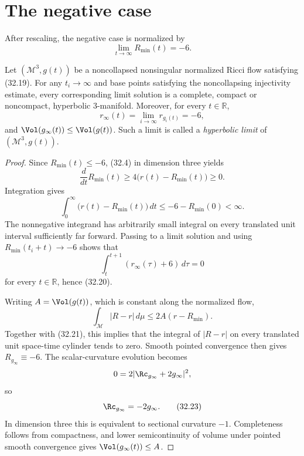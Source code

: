 \section{The negative case}

After rescaling, the negative case is normalized by
\begin{equation*}
 \lim_{t\to\infty}R_{\min}(t)=-6.
 \tag{32.19}
\end{equation*}

\begin{proposition}
\label{prop:chow-iv-negative-case-hyperbolic-limit}
Let $(\mathcal M^3,g(t))$ be a noncollapsed nonsingular normalized Ricci
flow satisfying (32.19).  For any $t_i\to\infty$ and base points satisfying
the noncollapsing injectivity estimate, every corresponding limit solution
is a complete, compact or noncompact, hyperbolic $3$-manifold.  Moreover,
for every $t\in\mathbb R$,
\begin{equation*}
 r_\infty(t)=\lim_{i\to\infty}r_{g_i(t)}=-6,
 \tag{32.20}
\end{equation*}
and $\Vol(g_\infty(t))\le\Vol(g(t))$.  Such a limit is called a
\emph{hyperbolic limit} of $(\mathcal M^3,g(t))$.
\end{proposition}
\begin{proof}
\sketch
Since $R_{\min}(t)\le-6$, (32.4) in dimension three yields
\[
 \frac d{dt}R_{\min}(t)
 \ge4\bigl(r(t)-R_{\min}(t)\bigr)\ge0.
\]
Integration gives
\begin{equation*}
 \int_0^\infty\bigl(r(t)-R_{\min}(t)\bigr)\,dt
 \le -6-R_{\min}(0)<\infty.
 \tag{32.21}
\end{equation*}
The nonnegative integrand has arbitrarily small integral on every translated
unit interval sufficiently far forward.  Passing to a limit solution and
using $R_{\min}(t_i+t)\to-6$ shows that
\[
 \int_t^{t+1}(r_\infty(\tau)+6)\,d\tau=0
\]
for every $t\in\mathbb R$, hence (32.20).

Writing $A=\Vol(g(t))$, which is constant along the normalized flow,
\[
 \int_{\mathcal M}|R-r|\,d\mu
 \le2A(r-R_{\min}).
\]
Together with (32.21), this implies that the integral of $|R-r|$ on every
translated unit space-time cylinder tends to zero.  Smooth pointed
convergence then gives $R_{g_\infty}\equiv-6$.  The scalar-curvature
evolution becomes
\[
 0=2|\Rc_{g_\infty}+2g_\infty|^2,
\]
so
\begin{equation*}
 \Rc_{g_\infty}=-2g_\infty.
 \tag{32.23}
\end{equation*}
In dimension three this is equivalent to sectional curvature $-1$.
Completeness follows from compactness, and lower semicontinuity of volume
under pointed smooth convergence gives
$\Vol(g_\infty(t))\le A$.
\end{proof}
